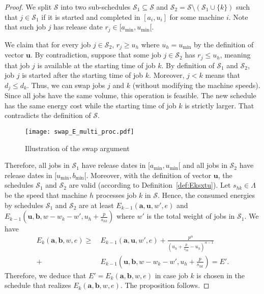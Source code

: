\documentclass[11pt,a4paper]{article}
\newcommand{\vecteur}[1]{\ensuremath{\mathbf{#1}}}
\begin{document}
\begin{proof}
We split $\mathcal{S}$ into two sub-schedules $\mathcal{S}_1\subseteq \mathcal{S}$ 
and $\mathcal{S}_2 = \mathcal{S} \setminus (\mathcal{S}_{1} \cup \{k\})$
such that $j \in \mathcal{S}_1$ if it is started and completed in $[a_{i},u_{i}]$ for 
some machine $i$. Note that such job $j$ has release date $r_{j} \in [a_{\min}, u_{\min}[$.

We claim that for every job $j \in \mathcal{S}_{2}$, $r_{j} \geq u_{h}$ where $u_{h} = u_{\min}$
by the definition of vector $\vecteur{u}$. 
By contradiction, suppose that some job $j \in \mathcal{S}_{2}$
has $r_{j} \leq u_{h}$, meaning that job $j$ is available at the starting time of 
job $k$. By definition of $\mathcal{S}_{1}$ and $\mathcal{S}_{2}$, 
job $j$ is started after the starting time of job $k$. Moreover, $j < k$ means that $d_{j} \leq d_{k}$.
Thus, we can swap jobs $j$ and $k$ (without modifying the machine speeds). 
Since all jobs have the same volume, this operation 
is feasible. The new schedule has the same energy cost while the starting time of job $k$ is
strictly larger. That contradicts the definition of $\mathcal{S}$.


\begin{figure}[!h]
\begin{center}
\texttt{[image: swap\_E\_multi\_proc.pdf]}
\end{center}
\caption{Illustration of the swap argument}
\label{fig_swap}
\end{figure}

Therefore, all jobs in $\mathcal{S}_{1}$ have release dates in $[a_{\min},u_{\min}[$
and all jobs in $\mathcal{S}_{2}$ have release dates in $[u_{\min},b_{\min}[$.
Moreover, with the definition of vector $\vecteur{u}$, the schedules
$\mathcal{S}_{1}$ and $\mathcal{S}_{2}$ are valid (according to Definition~\ref{def:Eksxtu}).
Let $s_{hk} \in \Lambda$ be the speed that machine $h$ processes job
$k$ in $\mathcal{S}$.
Hence, the consumed energies by schedules $\mathcal{S}_{1}$ and 
$\mathcal{S}_{2}$ are at least $E_{k-1}(\vecteur{a},\vecteur{u},w',e)$
and $E_{k-1}(\vecteur{u},\vecteur{b},w-w_{k} - w',u_{h} + \frac{p}{s_{hk}})$ where 
$w'$ is the total weight of jobs in $\mathcal{S}_{1}$. 
We have
\begin{align*}
E_k(\vecteur{a},\vecteur{b},w,e)
	\geq ~&E_{k-1}(\vecteur{a},\vecteur{u},w',e)
		+ \frac{p^{\alpha}}{(u_{h} + \frac{p}{s_{hk}} - u_{h})^{\alpha-1}}\\
		+ &E_{k-1}(\vecteur{u},\vecteur{b},w-w_{k} - w',u_{h}+ \frac{p}{s_{hk}}) = E'.
\end{align*}
Therefore, we deduce that $E' = E_k(\vecteur{a},\vecteur{b},w,e)$ in case 
job $k$ is chosen in the schedule that realizes $E_k(\vecteur{a},\vecteur{b},w,e)$.
The proposition follows.
\end{proof}
\end{document}
